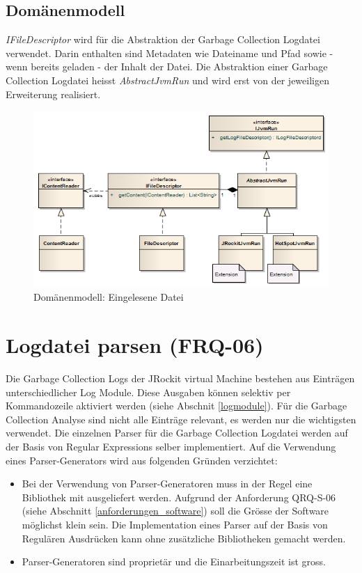 \subsection{Domänenmodell}
\textit{IFileDescriptor} wird für die Abstraktion der Garbage Collection Logdatei verwendet. Darin enthalten sind Metadaten wie Dateiname und Pfad sowie - wenn bereits geladen - der Inhalt der Datei. Die Abstraktion einer Garbage Collection Logdatei heisst \textit{AbstractJvmRun} und wird erst von der jeweiligen Erweiterung realisiert.
 \begin{figure}[H]
  	\centering
    	\includegraphics[width=16cm]{images/core_domain}
        	\caption{Domänenmodell: Eingelesene Datei}
\end{figure}

\section{Logdatei parsen (FRQ-06)}
Die Garbage Collection Logs der JRockit virtual Machine bestehen aus Einträgen unterschiedlicher Log Module. Diese Ausgaben können selektiv per Kommandozeile aktiviert werden (siehe Abschnit \ref{logmodule}). Für die Garbage Collection Analyse sind nicht alle Einträge relevant, es werden nur die wichtigsten verwendet. Die einzelnen Parser für die Garbage Collection Logdatei werden auf der Basis von Regular Expressions selber implementiert. Auf die Verwendung eines Parser-Generators wird aus folgenden Gründen verzichtet:
\begin{itemize}
	\item Bei der Verwendung von Parser-Generatoren muss in der Regel eine Bibliothek mit ausgeliefert werden. Aufgrund der Anforderung QRQ-S-06 (siehe Abschnitt \ref{anforderungen_software}) soll die Grösse der Software möglichst klein sein. Die Implementation eines Parser auf der Basis von Regulären Ausdrücken kann ohne zusätzliche Bibliotheken gemacht werden.
	\item Parser-Generatoren sind proprietär und die Einarbeitungszeit ist gross.
\end{itemize}

